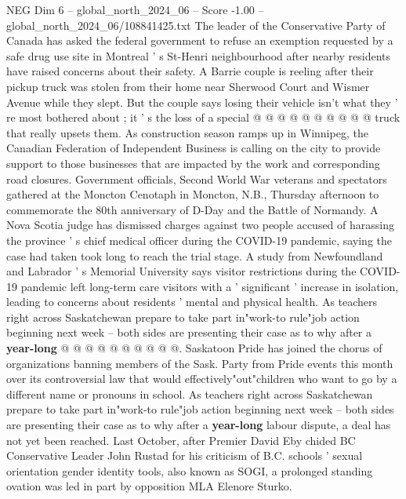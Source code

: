 \begin{textsample}{NEG Dim 6 – global\_north\_2024\_06 – Score -1.00 – global\_north\_2024\_06/108841425.txt}
The leader of the Conservative Party of Canada has asked the federal government to refuse an exemption requested by a safe drug use site in Montreal ' s St-Henri neighbourhood after nearby residents have raised concerns about their safety.
A Barrie couple is reeling after their pickup truck was stolen from their home near Sherwood Court and Wismer Avenue while they slept.
But the couple says losing their vehicle isn't what they ' re most bothered about ; it ' s the loss of a special @ @ @ @ @ @ @ @ @ @ truck that really upsets them.
As construction season ramps up in Winnipeg, the Canadian Federation of Independent Business is calling on the city to provide support to those businesses that are impacted by the work and corresponding road closures.
Government officials, Second World War veterans and spectators gathered at the Moncton Cenotaph in Moncton, N.B., Thursday afternoon to commemorate the 80th anniversary of D-Day and the Battle of Normandy.
A Nova Scotia judge has dismissed charges against two people accused of harassing the province ' s chief medical officer during the COVID-19 pandemic, saying the case had taken took long to reach the trial stage.
A study from Newfoundland and Labrador ' s Memorial University says visitor restrictions during the COVID-19 pandemic left long-term care visitors with a ' significant ' increase in isolation, leading to concerns about residents ' mental and physical health.
As teachers right across Saskatchewan prepare to take part in"work-to rule"job action beginning next week -- both sides are presenting their case as to why after a \textbf{year-long} @ @ @ @ @ @ @ @ @ @.
Saskatoon Pride has joined the chorus of organizations banning members of the Sask.
Party from Pride events this month over its controversial law that would effectively"out"children who want to go by a different name or pronouns in school.
As teachers right across Saskatchewan prepare to take part in"work-to rule"job action beginning next week -- both sides are presenting their case as to why after a \textbf{year-long} labour dispute, a deal has not yet been reached.
Last October, after Premier David Eby chided BC Conservative Leader John Rustad for his criticism of B.C. schools ' sexual orientation gender identity tools, also known as SOGI, a prolonged standing ovation was led in part by opposition MLA Elenore Sturko.

\end{textsample}
